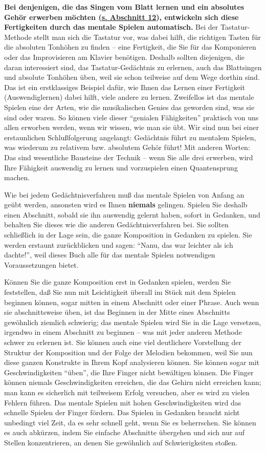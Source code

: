\textbf{Bei denjenigen, die das Singen vom Blatt lernen und ein absolutes Gehör erwerben möchten (\hyperref[c1iii12]{s. Abschnitt 12}), entwickeln sich diese Fertigkeiten durch das mentale Spielen automatisch.}
Bei der Tastatur-Methode stellt man sich die Tastatur vor, was dabei hilft, die richtigen Tasten für die absoluten Tonhöhen zu finden -- eine Fertigkeit, die Sie für das Komponieren oder das Improvisieren am Klavier benötigen.
Deshalb sollten diejenigen, die daran interessiert sind, das Tastatur-Gedächtnis zu erlernen, auch das Blattsingen und absolute Tonhöhen üben, weil sie schon teilweise auf dem Wege dorthin sind.
Das ist ein erstklassiges Beispiel dafür, wie Ihnen das Lernen einer Fertigkeit (Auswendiglernen) dabei hilft, viele andere zu lernen.
Zweifellos ist das mentale Spielen eine der Arten, wie die musikalischen Genies das geworden sind, was sie sind oder waren.
So können viele dieser \enquote{genialen Fähigkeiten} praktisch von uns allen erworben werden, wenn wir wissen, wie man sie übt.
Wir sind nun bei einer erstaunlichen Schlußfolgerung angelangt: Gedächtnis führt zu mentalem Spielen, was wiederum zu relativem bzw. absolutem Gehör führt!
Mit anderen Worten: Das sind wesentliche Bausteine der Technik -- wenn Sie alle drei erwerben, wird Ihre Fähigkeit auswendig zu lernen und vorzuspielen einen Quantensprung machen.

Wie bei jedem Gedächtnisverfahren muß das mentale Spielen von Anfang an geübt werden, ansonsten wird es Ihnen \textbf{niemals} gelingen.
Spielen Sie deshalb einen Abschnitt, sobald sie ihn auswendig gelernt haben, sofort in Gedanken, und behalten Sie dieses wie die anderen Gedächtnisverfahren bei.
Sie sollten schließlich in der Lage sein, die ganze Komposition in Gedanken zu spielen.
Sie werden erstaunt zurückblicken und sagen: \enquote{Nanu, das war leichter als ich dachte!}, weil dieses Buch alle für das mentale Spielen notwendigen Voraussetzungen bietet.

Können Sie die ganze Komposition erst in Gedanken spielen, werden Sie feststellen, daß Sie nun mit Leichtigkeit überall im Stück mit dem Spielen beginnen können, sogar mitten in einem Abschnitt oder einer Phrase.
Auch wenn sie abschnittsweise üben, ist das Beginnen in der Mitte eines Abschnitts gewöhnlich ziemlich schwierig; das mentale Spielen wird Sie in die Lage versetzen, irgendwo in einem Abschnitt zu beginnen -- was mit jeder anderen Methode schwer zu erlernen ist.
Sie können auch eine viel deutlichere Vorstellung der Struktur der Komposition und der Folge der Melodien bekommen, weil Sie nun diese ganzen Konstrukte in Ihrem Kopf analysieren können.
Sie können sogar mit Geschwindigkeiten \enquote{üben}, die Ihre Finger nicht bewältigen können.
Die Finger können niemals Geschwindigkeiten erreichen, die das Gehirn nicht erreichen kann; man kann es sicherlich mit teilweisem Erfolg versuchen, aber es wird zu vielen Fehlern führen.
Das mentale Spielen mit hohen Geschwindigkeiten wird das schnelle Spielen der Finger fördern.
Das Spielen in Gedanken braucht nicht unbedingt viel Zeit, da es sehr schnell geht, wenn Sie es beherrschen.
Sie können es auch abkürzen, indem Sie einfache Abschnitte übergehen und sich nur auf Stellen konzentrieren, an denen Sie gewöhnlich auf Schwierigkeiten stoßen.


